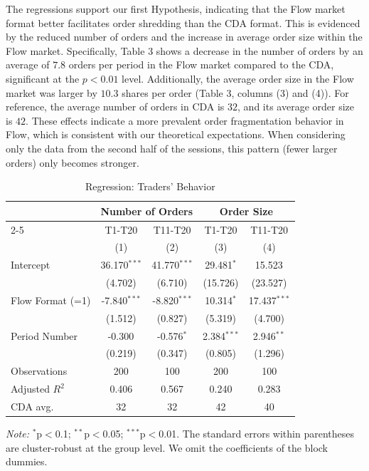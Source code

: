 The regressions support our first Hypothesis, indicating that the Flow market format better facilitates order shredding than the CDA format. This is evidenced by the reduced number of orders and the increase in average order size within the Flow market. Specifically, Table 3 shows a decrease in the number of orders by an average of $7.8$ orders per period in the Flow market compared to the CDA, significant at the $p<0.01$ level. Additionally, the average order size in the Flow market was larger by $10.3$ shares per order (Table 3, columns (3) and (4)). For reference, the average number of orders in CDA is $32$, and its average order size is $42$. These effects indicate a more prevalent order fragmentation behavior in Flow, which is consistent with our theoretical expectations. When considering only the data from the second half of the sessions, this pattern (fewer larger orders) only becomes stronger. %


\begin{table}[H]
\centering    
\caption{Regression: Traders' Behavior}
\begin{threeparttable}
\begin{tabular}{@{\extracolsep{5pt}}lcccc}
\toprule
& \multicolumn{2}{c}{Number of Orders} & \multicolumn{2}{c}{Order Size} \\
\cmidrule{2-5}
& T1-T20 & T11-T20 & T1-T20 & T11-T20 \\
& (1) & (2) & (3) & (4) \\
\midrule
Intercept & 36.170$^{***}$ & 41.770$^{***}$ & 29.481$^{*}$ & 15.523$^{}$ \\
 & (4.702) & (6.710) & (15.726) & (23.527) \\
Flow Format (=1) & -7.840$^{***}$ & -8.820$^{***}$ & 10.314$^{*}$ & 17.437$^{***}$ \\
 & (1.512) & (0.827) & (5.319) & (4.700) \\
Period Number & -0.300$^{}$ & -0.576$^{*}$ & 2.384$^{***}$ & 2.946$^{**}$ \\
 & (0.219) & (0.347) & (0.805) & (1.296) \\
\midrule
Observations & 200 & 100 & 200 & 100 \\
Adjusted $R^2$ & 0.406 & 0.567 & 0.240 & 0.283 \\
\midrule
CDA avg. & 32 & 32 & 42 & 40 \\
\bottomrule
\end{tabular}
\begin{tablenotes}
\footnotesize
\textit{Note:} $^{*}$p$<$0.1; $^{**}$p$<$0.05; $^{***}$p$<$0.01. The standard errors within parentheses are cluster-robust at the group level. We omit the coefficients of the block dummies. 
\end{tablenotes}
\end{threeparttable}
\label{tab:TradersBehavior}
\end{table}

